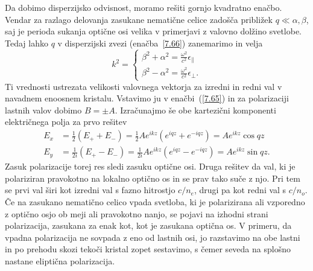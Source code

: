 Da dobimo disperzijsko odvisnost, moramo rešiti gornjo kvadratno enačbo. 
Vendar za razlago delovanja zasukane nematične celice zadošča približek 
$q\ll\alpha, \beta$, saj je perioda sukanja optične osi
velika v primerjavi z valovno dolžino svetlobe. Tedaj lahko $q$ v disperzijski
zvezi (enačba~\ref{7.66}) zanemarimo in velja
\begin{equation}
k^{2}=
\begin{cases}
\beta^{2}+\alpha^{2}=\frac{\omega^{2}}{c^{2}}\epsilon_{\parallel}\\
\beta^{2}-\alpha^{2}=\frac{\omega^{2}}{c^{2}}\epsilon_{\bot}.
\end{cases}
\label{7.67}
\end{equation}
Ti vrednosti ustrezata velikosti valovnega vektorja za izredni
in redni val v navadnem enoosnem kristalu. Vstavimo ju v enačbi~(\ref{7.65})
in za polarizaciji lastnih valov dobimo $B=\pm A$.
Izračunajmo še obe kartezični komponenti električnega polja za prvo rešitev
\begin{align}
E_{x} &=  \frac{1}{2}(E_{+}+E_{-})  =  \frac{1}{2}Ae^{ikz}(e^{iqz}+e^{-iqz})  =  Ae^{ikz}\cos qz\\
E_{y} & = \frac{1}{2i}(E_{+}-E_{-})  =  \frac{1}{2i}Ae^{ikz}(e^{iqz}-e^{-iqz})  =  Ae^{ikz}\sin qz.
\label{7.68}
\end{align}
Zasuk polarizacije torej res sledi zasuku optične osi. Druga rešitev da val,
ki je polariziran pravokotno na lokalno optično os in se prav tako
suče z njo. Pri tem se prvi val širi kot izredni val s fazno hitrostjo $c/n_{e}$, 
drugi pa kot redni val s $c/n_{o}$. Če na zasukano
nematično celico vpada svetloba, ki je polarizirana ali vzporedno z 
optično osjo ob meji ali pravokotno nanjo, se pojavi na izhodni strani 
polarizacija, zasukana za enak kot, kot je zasukana optična os. 
V primeru, da vpadna polarizacija ne sovpada z eno od
lastnih osi, jo razstavimo na obe lastni in po prehodu skozi
tekoči kristal zopet sestavimo, s čemer seveda na splošno nastane eliptična
polarizacija.

